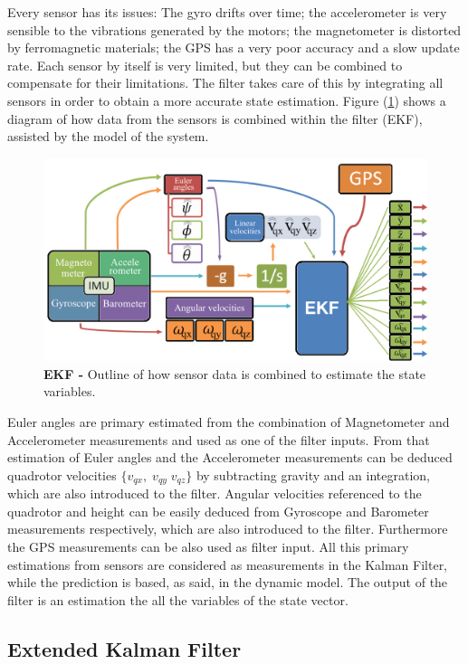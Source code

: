 \documentclass[conference]{IEEEtran}
\newcommand{\refp}[1]{(\ref{#1})}
\begin{document}
Every sensor has its issues: The gyro drifts over time; the accelerometer is very sensible to the vibrations generated by the motors; the magnetometer is distorted by ferromagnetic materials; the GPS has a very poor accuracy and a slow update rate. Each sensor by itself is very limited, but they can be combined to compensate for their limitations. The filter takes care of this by integrating all sensors in order to obtain a more accurate state estimation. Figure \refp{fig:diagrama_kalman} shows a diagram of how data from the sensors is combined within the filter (EKF), assisted by the model of the system.
\begin{figure}[h!]
	\centering
	\includegraphics[width=1\columnwidth]{./pics_paper/diagrama_kalman_eng.png}
	\caption{\textbf{EKF - } Outline of how sensor data is combined to estimate the state variables.}
	\label{fig:diagrama_kalman}
\end{figure}
Euler angles are primary estimated from the combination of Magnetometer and Accelerometer measurements and used as one of the filter inputs. From that estimation of Euler angles and the Accelerometer measurements can be deduced quadrotor velocities $\{v_{qx},\;v_{qy}\;v_{qz}\}$ by subtracting gravity and an integration, which are also introduced to the filter. Angular velocities referenced to the quadrotor and height can be easily deduced from Gyroscope and Barometer measurements respectively, which are also introduced to the filter. Furthermore the GPS measurements can be also used as filter input. All this primary estimations from sensors are considered as measurements in the Kalman Filter, while the prediction is based, as said, in the dynamic model. The output of the filter is an estimation the all the variables of the state vector.

\subsection{Extended Kalman Filter}
\label{sec:kalman-ekf}
\end{document}
